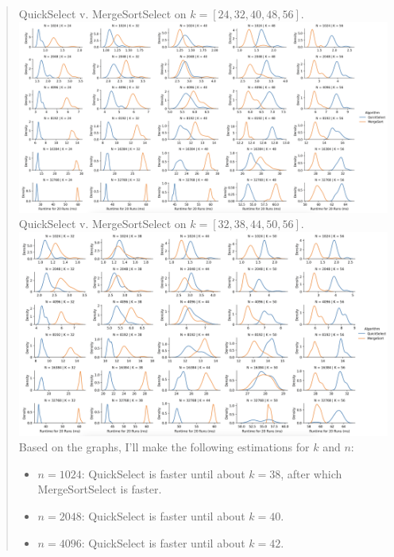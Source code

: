 \documentclass[11pt]{article}
\begin{document}
\begin{enumerate}
\begin{enumerate}
        \begin{quote}
        \color{purple}
        \vspace{1em}
           QuickSelect v. MergeSortSelect on $k = [24, 32, 40, 48, 56]$. \newline
           \newline
            \includegraphics[scale=0.2]{qs [24, 32, 40, 48, 56].png} 
           \newline
           QuickSelect v. MergeSortSelect on $k = [32, 38, 44, 50, 56]$. \newline
           \newline
            \includegraphics[scale=0.2]{qs [32, 38, 44, 50, 56].png} 
           \newline
           Based on the graphs, I'll make the following estimations for $k$ and $n$:
           \begin{itemize}
               \item $n = 1024$: QuickSelect is faster until about $k = 38$, after which MergeSortSelect is faster.
               \item $n = 2048$: QuickSelect is faster until about $k = 40$.
               \item $n = 4096$: QuickSelect is faster until about $k = 42$.

\end{itemize}
\end{quote}
\end{enumerate}
\end{enumerate}
\end{document}
